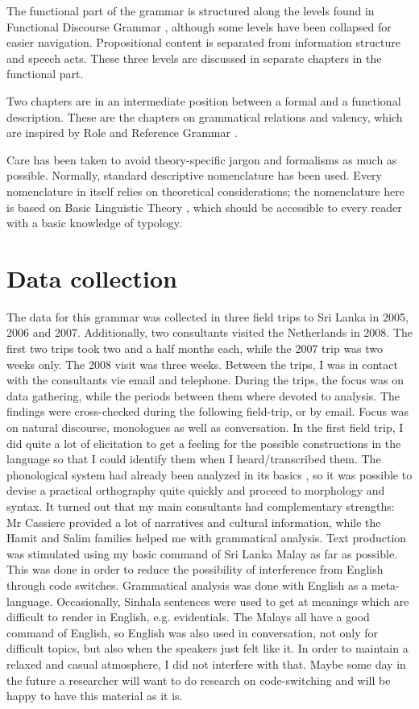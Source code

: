 The functional part of the grammar is structured along the levels found in Functional Discourse Grammar \citep{HengeveldEtAl2008fdg}, although some levels have been collapsed for easier na\-vi\-ga\-tion. Propositional content is separated from information structure and speech acts. These three levels are discussed in separate chapters in the functional part.

Two chapters are in an intermediate position between a formal and a functional description. These are the chapters on grammatical relations and valency, which are inspired by Role and Reference Grammar \citep{VanValinEtAl1997rrg}.

Care has been taken to avoid theory-specific jargon and formalisms as much as possible. Normally, standard descriptive nomenclature has been used. Every nomenclature in itself relies on theoretical considerations; the nomenclature here is based on Basic Linguistic Theory \citep{Dixon1997riseandfall, Dryer2006blt}, which should be accessible to every reader with a basic knowledge of typology.

\section{Data collection}
The data for this grammar was collected  in three field trips to Sri Lanka in 2005, 2006 and 2007. Additionally,  two consultants visited the Netherlands in 2008. The first two trips took two and a half months each, while the 2007 trip was two weeks only. The 2008 visit was three weeks. Between the trips, I was in contact with the consultants vie email and telephone. During the trips, the focus was on data gathering, while the periods between them where devoted to analysis. The findings were cross-checked during the following field-trip, or by email. Focus was on natural discourse, monologues as well as conversation. In the first field trip, I did quite a lot of elicitation to get a feeling for the possible constructions in the language so that I could identify them when I heard/transcribed them. The phonological system had  already been analyzed in  its basics \citep{Bichsel}, so it was possible to devise a practical orthography quite quickly and proceed to morphology and syntax. It turned out that my main consultants had complementary strengths: Mr Cassiere provided a lot of narratives and cultural information, while the Hamit and Salim families helped me with grammatical analysis. Text production was stimulated using my basic command of Sri Lanka Malay as far as possible. This was done in order to reduce the possibility of interference from English through code switches. Grammatical analysis was done with English as a meta-language. Occasionally, Sinhala sentences were used to get at meanings which are difficult to render in English, e.g. evidentials. The Malays all have a good command of English, so English was also used in conversation, not only for difficult topics, but also when the speakers just felt like it. In order to maintain a relaxed and casual atmosphere, I did not interfere with that. Maybe some day in the future a researcher will want to do research on code-switching and will be happy to have this material as it is.

